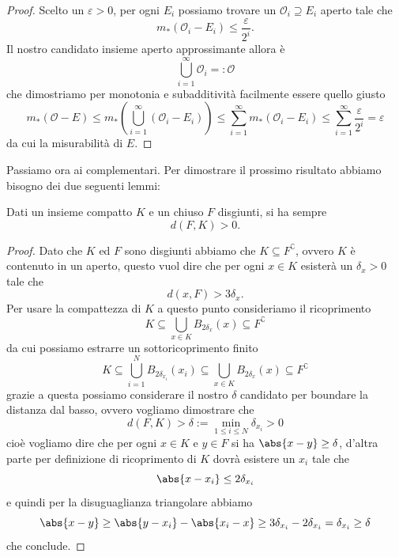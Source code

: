 \documentclass[11pt]{scrartcl}
\begin{document}
	\begin{proof}
		Scelto un $\varepsilon>0$, per ogni $E_i$ possiamo trovare un $\mathcal{O}_i\supseteq E_i$ aperto tale che
		$$m_*\left(\mathcal{O}_i-E_i\right)\le \frac{\varepsilon}{2^i}.$$
		Il nostro candidato insieme aperto approssimante allora è
		$$\bigcup_{i=1}^\infty \mathcal{O}_i=:\mathcal{O}$$
		che dimostriamo per monotonia e subadditività facilmente essere quello giusto
		$$m_*\left(\mathcal{O}-E\right)\le m_*\left(\bigcup_{i=1}^\infty\left(\mathcal{O}_i-E_i\right)\right)\le \sum_{i=1}^{\infty}m_*\left(\mathcal{O}_i-E_i\right)\le \sum_{i=1}^{\infty}\frac{\varepsilon}{2^i}=\varepsilon$$
		da cui la misurabilità di $E$.
	\end{proof}
	Passiamo ora ai complementari. Per dimostrare il prossimo risultato abbiamo bisogno dei due seguenti lemmi:
	\begin{lemma}
		Dati un insieme compatto $K$ e un chiuso $F$ disgiunti, si ha sempre
		$$d(F,K)>0.$$
	\end{lemma}
	\begin{proof}
		Dato che $K$ ed $F$ sono disgiunti abbiamo che $K \subseteq F^\complement$, ovvero $K$ è contenuto in un aperto, questo vuol dire che per ogni $x\in K$ esisterà un $\delta_x>0$ tale che
		$$d(x,F)>3\delta_x.$$
		Per usare la compattezza di $K$ a questo punto consideriamo il ricoprimento
		$$K\subseteq \bigcup_{x\in K}B_{2\delta_x}(x)\subseteq F^\complement$$ 
		da cui possiamo estrarre un sottoricoprimento finito
		$$K\subseteq \bigcup_{i=1}^N B_{2\delta_{x_i}}(x_i)\subseteq \bigcup_{x\in K}B_{2\delta_x}(x)\subseteq F^\complement$$
		grazie a questa possiamo considerare il nostro $\delta$ candidato per boundare la distanza dal basso, ovvero vogliamo dimostrare che 
		$$d(F,K)>\delta:=\min_{1\le i\le N}\delta_{x_i}>0$$
		cioè vogliamo dire che per ogni $x\in K$ e $y\in F$ si ha $\abs{x-y}\ge \delta$, d'altra parte per definizione di ricoprimento di $K$ dovrà esistere un $x_i$ tale che
		$$\abs{x-x_i}\le 2\delta_{x_i}$$
		e quindi per la disuguaglianza triangolare abbiamo
		$$\abs{x-y}\ge \abs{y-x_i}-\abs{x_i-x}\ge 3\delta_{x_i}-2\delta_{x_i}=\delta_{x_i}\ge \delta$$
		che conclude.
	\end{proof}
	
\end{document}
